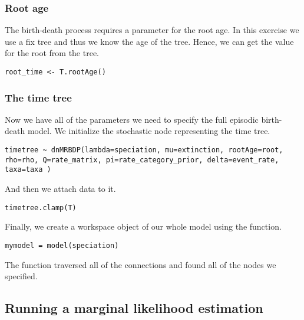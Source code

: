 \subsubsection{Root age}

The birth-death process requires a parameter for the root age.
In this exercise we use a fix tree and thus we know the age of the tree.
Hence, we can get the value for the root from the \citet{Springer2012} tree.
{\tt \begin{snugshade*}
\begin{lstlisting}
root_time <- T.rootAge()
\end{lstlisting}
\end{snugshade*}}

\subsubsection{The time tree}

Now we have all of the parameters we need to specify the full episodic birth-death model. 
We initialize the stochastic node representing the time tree.
{\tt \begin{snugshade*}
\begin{lstlisting}
timetree ~ dnMRBDP(lambda=speciation, mu=extinction, rootAge=root, rho=rho, Q=rate_matrix, pi=rate_category_prior, delta=event_rate, taxa=taxa )
\end{lstlisting}
\end{snugshade*}}
And then we attach data to it.
{\tt \begin{snugshade*}
\begin{lstlisting}
timetree.clamp(T)
\end{lstlisting}
\end{snugshade*}}



Finally, we create a workspace object of our whole model using the  function. 
{\tt \begin{snugshade*}
\begin{lstlisting}
mymodel = model(speciation)
\end{lstlisting}
\end{snugshade*}}

The  function traversed all of the connections and found all of the nodes we specified. 


\subsection{Running a marginal likelihood estimation}

